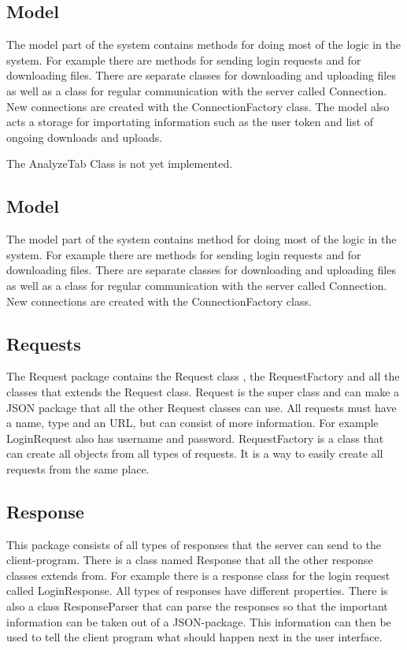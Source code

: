 \subsection{Model}
The model part of the system contains methods for doing most of the logic in the system. For example there are methods for sending login requests and for downloading files. There are separate classes for downloading and uploading files as well as a class for regular communication with the server called Connection. New connections are created with the ConnectionFactory class. The model also acts a storage for importating information such as the user token and list of ongoing downloads and uploads.

The AnalyzeTab Class is not yet implemented.

\subsection{Model}
The model part of the system contains method for doing most of the logic in the system. For example there are methods for sending login requests and for downloading files. There are separate classes for downloading and uploading files as well as a class for regular communication with the server called Connection. New connections are created with the ConnectionFactory class.

\subsection{Requests}
The Request package contains the Request class , the RequestFactory and all the classes that extends the Request class. Request is the super class and can make a JSON package that all the other Request classes can use. All requests must have a name, type and an URL, but can consist of more information. For example LoginRequest also has username and password. RequestFactory is a class that can create all objects from all types of requests. It is a way to easily create all requests from the same place.


\subsection{Response}
This package consists of all types of responses that the server can send to the client-program. There is a class named Response that all the other response classes extends from. For example there is a response class for the login request called LoginResponse. All types of responses have different properties. There is also a class ResponseParser that can parse the responses so that the important information can be taken out of a JSON-package. This information can then be used to tell the client program what should happen next in the user interface.


